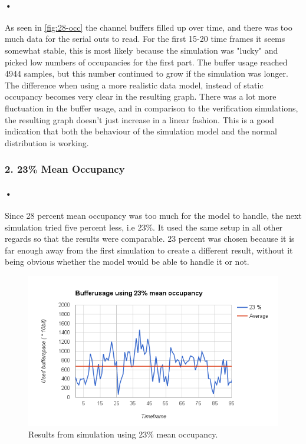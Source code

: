 \documentclass[a4paper, 12pt]{report}
\begin{document}
\paragraph{•}
As seen in \ref{fig:28-occ} the channel buffers filled up over time, and there was too much data for the serial outs to read.
For the first 15-20 time frames it seems somewhat stable, this is most likely because the simulation was "lucky" and picked low numbers of occupancies for the first part.
The buffer usage reached 4944 samples, but this number continued to grow if the simulation was longer.
The difference when using a more realistic data model, instead of static occupancy becomes very clear in the resulting graph.
There was a lot more fluctuation in the buffer usage, and in comparison to the verification simulations, the resulting graph doesn't just increase in a linear fashion.
This is a good indication that both the behaviour of the simulation model and the normal distribution is working.


\subsubsection{2. 23\% Mean Occupancy}

\paragraph{•}
Since 28 percent mean occupancy was too much for the model to handle, the next simulation tried five percent less, i.e 23\%.
It used the same setup in all other regards so that the results were comparable.
23 percent was chosen because it is far enough away from the first simulation to create a different result, without it being obvious whether the model would be able to handle it or not.

\begin{figure}[h!]
	\centering
		\includegraphics[width=1.0\textwidth]{images/23-occ.png}
		\caption{Results from simulation using 23\% mean occupancy.}
		\label{fig:23-occ}
\end{figure}
\end{document}
